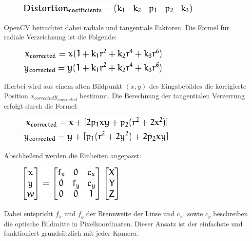 \begin{figure}[ht]
	\centering
	\includegraphics[scale=0.7]{Bilder/distortion.png}
	\label{fig:distortion}
\end{figure}

OpenCV betrachtet dabei radiale und tangentiale Faktoren. Die Formel für radiale Verzeichnung ist die Folgende:

\begin{figure}[ht]
	\centering
	\includegraphics[scale=0.7]{Bilder/radialFactors.png}
	\label{fig:radial}
\end{figure}

Hierbei wird aus einem alten Bildpunkt $(x,y)$ des Eingabebildes die korrigierte Position $x_{corrected} y_{corrected}$ bestimmt. \newline
Die Berechnung der tangentialen Verzerrung erfolgt durch die Formel:

\begin{figure}[ht]
	\centering
	\includegraphics[scale=0.7]{Bilder/tangentialFactors.png}
	\label{fig:radial}
\end{figure}

Abschließend werden die Einheiten angepasst:

\begin{figure}[ht]
	\centering
	\includegraphics[scale=0.7]{Bilder/matrixEquation.png}
	\label{fig:radial}
\end{figure}

Dabei entspricht $f_x$ und $f_y$ der Brennweite der Linse und $c_x$, sowie $c_y$ beschreiben die optische Bildmitte in Pixelkoordinaten. \cite{cameracalibration}\newline
Dieser Ansatz ist der einfachste und funktioniert grundsätzlich mit jeder Kamera.


